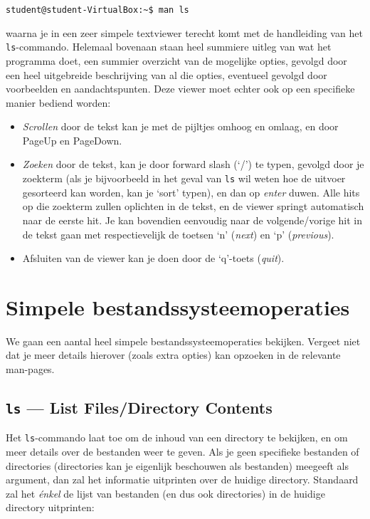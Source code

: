 \documentclass[a4paper,twoside,openany]{memoir}
\begin{document}
\begin{verbatim}
student@student-VirtualBox:~$ man ls
\end{verbatim}
waarna je in een zeer simpele textviewer terecht komt met de handleiding van het
\verb!ls!-commando. Helemaal bovenaan staan heel summiere uitleg van wat het
programma doet, een summier overzicht van de mogelijke opties, gevolgd door een
heel uitgebreide beschrijving van al die opties, eventueel gevolgd door
voorbeelden en aandachtspunten. Deze viewer moet echter ook op een specifieke
manier bediend worden:

\begin{itemize}

  \item \emph{Scrollen} door de tekst kan je met de pijltjes omhoog en omlaag,
    en door PageUp en PageDown.

  \item \emph{Zoeken} door de tekst, kan je door forward slash (`/') te typen,
    gevolgd door je zoekterm (als je bijvoorbeeld in het geval van \verb!ls! wil
    weten hoe de uitvoer gesorteerd kan worden, kan je `sort' typen), en dan op
    \emph{enter} duwen. Alle hits op die zoekterm zullen oplichten in de tekst,
    en de viewer springt automatisch naar de eerste hit. Je kan bovendien
    eenvoudig naar de volgende/vorige hit in de tekst gaan met respectievelijk
    de toetsen `n' (\emph{next}) en `p' (\emph{previous}).

  \item {Afsluiten} van de viewer kan je doen door de `q'-toets (\emph{quit}).

\end{itemize}

\chapter{Simpele bestandssysteemoperaties}

We gaan een aantal heel simpele bestandssysteemoperaties bekijken. Vergeet niet
dat je meer details hierover (zoals extra opties) kan opzoeken in de relevante
man-pages.

\section{\texttt{ls} --- List Files/Directory Contents}

Het \verb!ls!-commando laat toe om de inhoud van een directory te bekijken, en
om meer details over de  bestanden weer te geven. Als je geen specifieke
bestanden of directories (directories kan je eigenlijk beschouwen als bestanden)
meegeeft als argument, dan zal het informatie uitprinten over de huidige
directory. Standaard zal het \emph{énkel} de lijst van bestanden (en dus ook
directories) in de huidige directory uitprinten:
\end{document}
